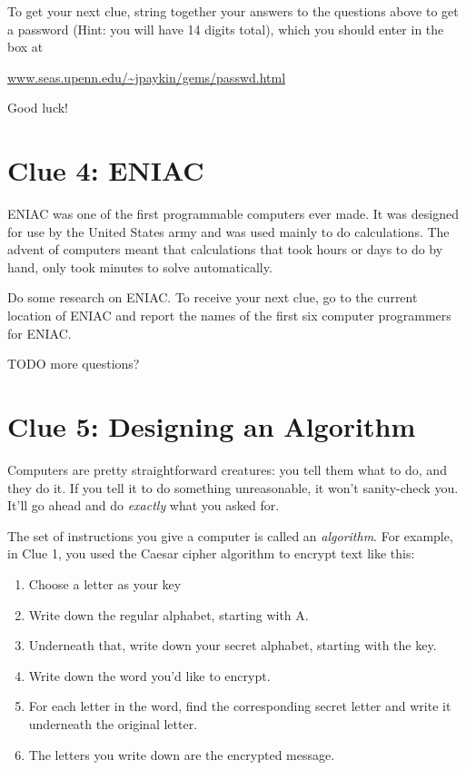 \documentclass{article}
\begin{document}


To get your next clue, string together your answers to the questions above to
get a password (Hint: you will have 14 digits total), which you should enter in
the box at
\begin{center}
    \url{www.seas.upenn.edu/~jpaykin/gems/passwd.html}
\end{center}
Good luck!
  
\newpage


\section*{Clue 4: ENIAC}
ENIAC was one of the first programmable computers ever made. It was designed for use by the United States army and was used mainly to do calculations. The advent of computers meant that calculations that took hours or days to do by hand, only took minutes to solve automatically.

Do some research on ENIAC. To receive your next clue, go to the current location of ENIAC and report the names of the first six computer programmers for ENIAC.

TODO more questions?

\newpage

\section*{Clue 5: Designing an Algorithm}
Computers are pretty straightforward creatures: you tell them what to do, and they do it. If you tell it to do something unreasonable, it won't sanity-check you. It'll go ahead and do \textit{exactly} what you asked for.

The set of instructions you give a computer is called an \textit{algorithm}. For example, in Clue 1, you used the Caesar cipher algorithm to encrypt text like this:
\begin{enumerate}[noitemsep]
  \item Choose a letter as your key
  \item Write down the regular alphabet, starting with A.
  \item Underneath that, write down your secret alphabet, starting with the key.
  \item Write down the word you'd like to encrypt.
  \item For each letter in the word, find the corresponding secret letter and write it underneath the original letter.
  \item The letters you write down are the encrypted message.
\end{enumerate}
\end{document}
